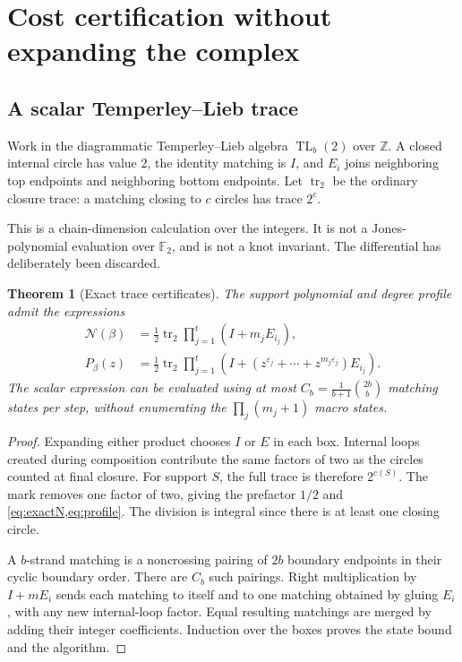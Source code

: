 \documentclass[11pt,letterpaper]{article}
\newtheorem{theorem}{Theorem}[section]
\theoremstyle{definition}
\newcommand{\F}{\mathbb F_2}
\newcommand{\Z}{\mathbb Z}
\newcommand{\tr}{\operatorname{tr}}
\newcommand{\TL}{\operatorname{TL}}
\newcommand{\N}{\mathcal N}
\newcommand{\eps}{\varepsilon}
\begin{document}
\section{Cost certification without expanding the complex}\label{sec:trace}
\subsection{A scalar Temperley--Lieb trace}
Work in the diagrammatic Temperley--Lieb algebra \(\TL_b(2)\) over \(\Z\). A closed internal circle has value \(2\), the identity matching is \(I\), and \(E_i\) joins neighboring top endpoints and neighboring bottom endpoints. Let \(\tr_2\) be the ordinary closure trace: a matching closing to \(c\) circles has trace \(2^c\).

This is a chain-dimension calculation over the integers. It is not a Jones-polynomial evaluation over \(\F\), and is not a knot invariant. The differential has deliberately been discarded.

\begin{theorem}[Exact trace certificates]\label{thm:trace}
The support polynomial and degree profile admit the expressions
\begin{align}
 \N(\beta)&=\frac12\tr_2\prod_{j=1}^t(I+m_jE_{i_j}),\label{eq:traceN}\\
 P_\beta(z)&=\frac12\tr_2\prod_{j=1}^t
       \left(I+(z^{\eps_j}+\cdots+z^{m_j\eps_j})E_{i_j}\right).
       \label{eq:traceP}
\end{align}
The scalar expression can be evaluated using at most \(C_b=\frac1{b+1}\binom{2b}{b}\) matching states per step, without enumerating the \(\prod_j(m_j+1)\) macro states.
\end{theorem}
\begin{proof}
Expanding either product chooses \(I\) or \(E\) in each box. Internal loops created during composition contribute the same factors of two as the circles counted at final closure. For support \(S\), the full trace is therefore \(2^{c(S)}\). The mark removes one factor of two, giving the prefactor \(1/2\) and \cref{eq:exactN,eq:profile}. The division is integral since there is at least one closing circle.

A \(b\)-strand matching is a noncrossing pairing of \(2b\) boundary endpoints in their cyclic boundary order. There are \(C_b\) such pairings. Right multiplication by \(I+mE_i\) sends each matching to itself and to one matching obtained by gluing \(E_i\), with any new internal-loop factor. Equal resulting matchings are merged by adding their integer coefficients. Induction over the boxes proves the state bound and the algorithm.
\end{proof}
\end{document}
